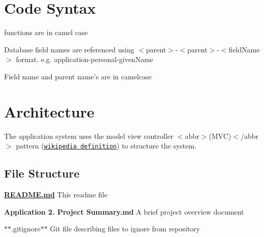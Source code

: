 \section*{Code Syntax}


\begin{DoxyEnumerate}
\item functions are in camel case
\end{DoxyEnumerate}
\begin{DoxyEnumerate}
\item Database field names are referenced using $<$parent$>$-\/$<$parent$>$-\/$<$field\-Name$>$ format. e.\-g. application-\/personal-\/given\-Name
\begin{DoxyEnumerate}
\item Field name and parent name's are in camelcase
\end{DoxyEnumerate}
\end{DoxyEnumerate}

\section*{Architecture}

The application system uses the model view controller $<$abbr$>$(M\-V\-C)$<$/abbr$>$ pattern (\href{http://en.wikipedia.org/wiki/Model%E2%80%93view%E2%80%93controller}{\tt wikipedia definition}) to structure the system.

\subsection*{File Structure}


\begin{DoxyItemize}
\item {\bfseries \hyperlink{_r_e_a_d_m_e_8md}{R\-E\-A\-D\-M\-E.\-md}} This readme file
\item {\bfseries Application 2. Project Summary.\-md} A brief project overview document
\item $\ast$$\ast$.gitignore$\ast$$\ast$ Git file describing files to ignore from repository
\end{DoxyItemize}



